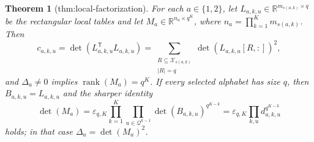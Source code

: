 \documentclass{article}
\newtheorem{theorem}{Theorem}
\begin{document}
\begin{theorem}[thm:local-factorization]\label{thm:local-factorization}
For each \(a\in\{1,2\}\), let \(L_{a,k,u}\in\mathbb R^{m_{s(a,k)}\times q}\) be the rectangular local tables and let \(M_a\in\mathbb R^{n_a\times q^K}\), where \(n_a=\prod_{k=1}^Km_{s(a,k)}\).  Then
\[
 c_{a,k,u}=\det(L_{a,k,u}^{\mathsf T}L_{a,k,u})
 =\sum_{\substack{R\subseteq\mathcal X_{s(a,k)}\\|R|=q}}
 \det(L_{a,k,u}[R,:])^2,
\]
and \(\Delta_a\neq0\) implies \(\operatorname{rank}(M_a)=q^K\).  If every selected alphabet has size \(q\), then \(B_{a,k,u}=L_{a,k,u}\) and the sharper identity
\[
 \det(M_a)=\varepsilon_{q,K}
 \prod_{k=1}^K\prod_{u\in\mathcal Q^{k-1}}
 \det(B_{a,k,u})^{q^{K-k}}
 =\varepsilon_{q,K}\prod_{k,u}d_{a,k,u}^{q^{K-k}}
\]
holds; in that case \(\Delta_a=\det(M_a)^2\).
\end{theorem}
\end{document}
